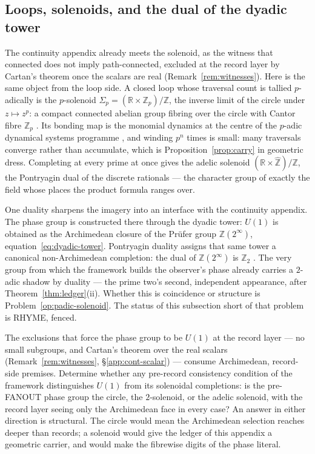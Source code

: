 \subsection{Loops, solenoids, and the dual of the dyadic tower}
\label{app:padic-solenoid}

The continuity appendix already meets the solenoid, as the witness that connected does
not imply path-connected, excluded at the record layer by Cartan's theorem once the
scalars are real (Remark~\ref{rem:witnesses}). Here is the same object from the loop
side. A closed loop whose traversal count is tallied $p$-adically is the $p$-solenoid
$\Sigma_p = (\mathbb{R} \times \mathbb{Z}_p)/\mathbb{Z}$, the inverse limit of the
circle under $z \mapsto z^{p}$: a compact connected abelian group fibring over the
circle with Cantor fibre $\mathbb{Z}_p$ \autocite{vandantzig1930, hewittross1963}. Its
bonding map is the monomial dynamics at the centre of the $p$-adic dynamical systems
programme \autocite{khrennikovnilsson2004}, and winding $p^{n}$ times is small: many
traversals converge rather than accumulate, which is Proposition~\ref{prop:carry} in
geometric dress. Completing at every prime at once gives the adelic solenoid
$(\mathbb{R} \times \widehat{\mathbb{Z}})/\mathbb{Z}$, the Pontryagin dual of the
discrete rationals \autocite{hewittross1963} --- the character group of exactly the
field whose places the product formula ranges over.

One duality sharpens the imagery into an interface with the continuity appendix. The
phase group is constructed there through the dyadic tower: $U(1)$ is obtained as the
Archimedean closure of the Pr\"ufer group $\mathbb{Z}(2^{\infty})$,
equation~\eqref{eq:dyadic-tower}. Pontryagin duality assigns that same tower a
canonical non-Archimedean completion: the dual of $\mathbb{Z}(2^{\infty})$ is
$\mathbb{Z}_2$ \autocite{hewittross1963}. The very group from which the framework
builds the observer's phase already carries a $2$-adic shadow by duality --- the prime
two's second, independent appearance, after Theorem~\ref{thm:ledger}(ii). Whether this
is coincidence or structure is Problem~\ref{op:padic-solenoid}. The status of this
subsection short of that problem is RHYME, fenced.

\begin{openproblem}\label{op:padic-solenoid}
The exclusions that force the phase group to be $U(1)$ at the record layer --- no
small subgroups, and Cartan's theorem over the real scalars
(Remark~\ref{rem:witnesses}, \S\ref{app:cont-scalar}) --- consume Archimedean,
record-side premises. Determine whether any pre-record consistency condition of the
framework distinguishes $U(1)$ from its solenoidal completions: is the pre-FANOUT
phase group the circle, the $2$-solenoid, or the adelic solenoid, with the record
layer seeing only the Archimedean face in every case? An answer in either direction is
structural. The circle would mean the Archimedean selection reaches deeper than
records; a solenoid would give the ledger of this appendix a geometric carrier, and
would make the fibrewise digits of the phase literal.
\end{openproblem}

